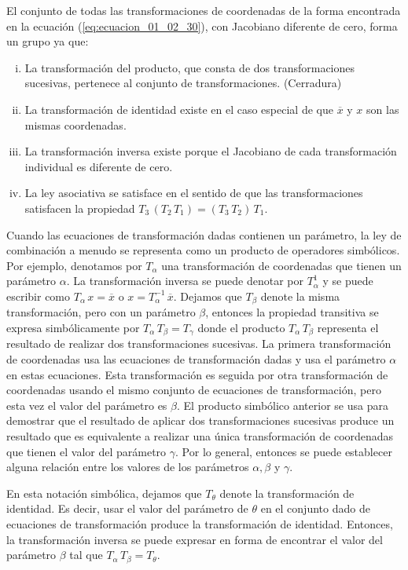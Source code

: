 \documentclass[hidelinks,12pt]{article}
\begin{document}
El conjunto de todas las transformaciones de coordenadas de la forma encontrada en la ecuación (\ref{eq:ecuacion_01_02_30}), con Jacobiano diferente de cero, forma un grupo ya que:
\begin{enumerate}[(i)]
\item La transformación del producto, que consta de dos transformaciones sucesivas, pertenece al conjunto de transformaciones. (Cerradura)
\item La transformación de identidad existe en el caso especial de que $\overline{x}$ y $x$ son las mismas coordenadas.
\item La transformación inversa existe porque el Jacobiano de cada transformación individual es diferente de cero.
\item La ley asociativa se satisface en el sentido de que las transformaciones satisfacen la propiedad $T_{3} \, (T_{2} \, T_{1}) = (T_{3} \, T_{2}) \, T_{1}$.
\end{enumerate}
Cuando las ecuaciones de transformación dadas contienen un parámetro, la ley de combinación a menudo se representa como un producto de operadores simbólicos. Por ejemplo, denotamos por $T_{\alpha}$ una transformación de coordenadas que tienen un parámetro $\alpha$. La transformación inversa se puede denotar por $T_{\alpha}^{1}$ y se puede escribir como $T_{\alpha} \, x = \overline{x}$ o $x = T_{\alpha}^{-1} \, \overline{x}$. Dejamos que $T_{\beta}$ denote la misma transformación, pero con un parámetro $\beta$, entonces la propiedad transitiva se expresa simbólicamente por $T_{\alpha} \, T_{\beta} = T_{\gamma}$ donde el producto $T_{\alpha} \, T_{\beta}$ representa el resultado de realizar dos transformaciones sucesivas. La primera transformación de coordenadas usa las ecuaciones de transformación dadas y usa el parámetro $\alpha$ en estas ecuaciones. Esta transformación es seguida por otra transformación de coordenadas usando el mismo conjunto de ecuaciones de transformación, pero esta vez el valor del parámetro es $\beta$. El producto simbólico anterior se usa para demostrar que el resultado de aplicar dos transformaciones sucesivas produce un resultado que es equivalente a realizar una única transformación de coordenadas que tienen el valor del parámetro $\gamma$. Por lo general, entonces se puede establecer alguna relación entre los valores de los parámetros $\alpha, \beta$ y $\gamma$.
\par
En esta notación simbólica, dejamos que $T_\theta$ denote la transformación de identidad. Es decir, usar el valor del parámetro de $\theta$ en el conjunto dado de ecuaciones de transformación produce la transformación de identidad. Entonces, la transformación inversa se puede expresar en forma de encontrar el valor del parámetro $\beta$ tal que $T_{\alpha} \, T_{\beta} = T_{\theta}$.
\end{document}
